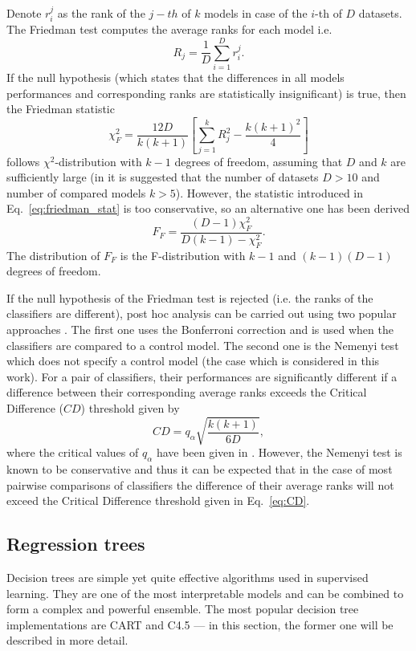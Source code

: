 \documentclass[magisterska, english]{pwr_wmat_praca_dyplomowa}
\theoremstyle{plain}
\numberwithin{theorem}{chapter}
\theoremstyle{definition}
\numberwithin{theorem}{chapter}
\begin{document}
Denote $r_i^j$ as the rank of the $j-th$ of $k$ models in case of the $i$-th of $D$ datasets. The Friedman test computes the average ranks for each model i.e.
\begin{equation}
    R_j = \frac 1D \sum_{i=1}^D r_i^j.
\end{equation}
If the null hypothesis (which states that the differences in all models performances and corresponding ranks are statistically insignificant) is true, then the Friedman statistic~\cite{demsar}
\begin{equation}\label{eq:friedman_stat}
    \chi^2_F = \frac{12D}{k(k+1)} \left[\sum_{j=1}^k R_j^2 - \frac{k(k+1)^2}{4}\right]
\end{equation}
follows $\chi^2$-distribution with $k-1$ degrees of freedom, assuming that $D$ and $k$ are sufficiently large (in \cite{demsar} it is suggested that the number of datasets $D>10$ and number of compared models $k>5$). However, the statistic introduced in Eq.~\eqref{eq:friedman_stat} is too conservative, so an alternative one has been derived
\begin{equation}\label{eq:iman_dav}
    F_F = \frac{(D-1)\chi^2_F}{D(k-1)-\chi^2_F}.
\end{equation}
The distribution of $F_F$ is the F-distribution with $k-1$ and $(k-1)(D-1)$ degrees of freedom.

If the null hypothesis of the Friedman test is rejected (i.e. the ranks of the classifiers are different), post hoc analysis can be carried out using two popular approaches \cite{demsar}. The first one uses the Bonferroni correction and is used when the classifiers are compared to a control model. The second one is the Nemenyi test which does not specify a control model (the case which is considered in this work). For a pair of classifiers, their performances are significantly different if a difference between their corresponding average ranks exceeds the Critical Difference ($CD$) threshold given by
\begin{equation}\label{eq:CD}
    CD = q_{\alpha}\sqrt{\frac{k(k+1)}{6D}},
\end{equation}
where the critical values of $q_{\alpha}$ have been given in \cite{demsar}. However, the Nemenyi test is known to be conservative \cite{demsar} and thus it can be expected that in the case of most pairwise comparisons of classifiers the difference of their average ranks will not exceed the Critical Difference threshold given in Eq.~\eqref{eq:CD}.

\subsection{Regression trees}
Decision trees are simple yet quite effective algorithms used in supervised learning. They are one of the most interpretable models and can be combined to form a complex and powerful ensemble. The most popular decision tree implementations are CART and C4.5 \cite{esl} --- in this section, the former one will be described in more detail.
\end{document}
